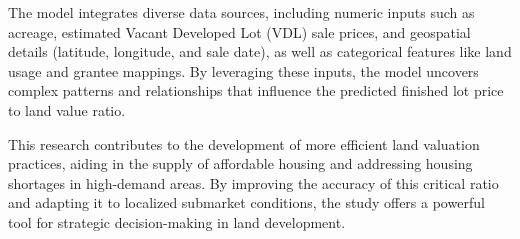 The model integrates diverse data sources, including numeric inputs such as acreage,
estimated Vacant Developed Lot (VDL) sale prices, and geospatial details (latitude,
longitude, and sale date), as well as categorical features like land usage and
grantee mappings. By leveraging these inputs, the model uncovers complex
patterns and relationships that influence the predicted finished lot price to
land value ratio.

This research contributes to the development of more efficient land valuation
practices, aiding in the supply of affordable housing and addressing housing shortages
in high-demand areas. By improving the accuracy of this critical ratio and
adapting it to localized submarket conditions, the study offers a powerful tool for
strategic decision-making in land development.
